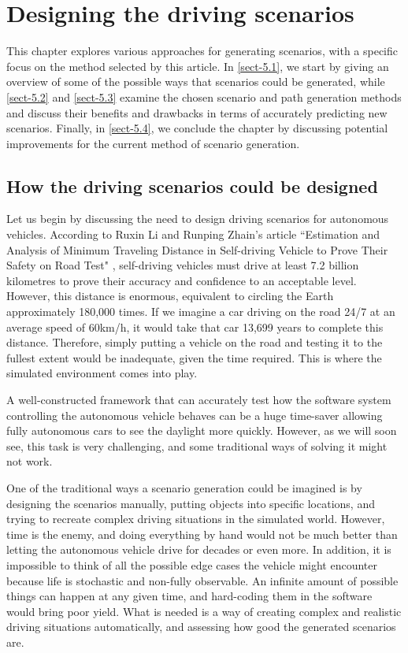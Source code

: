 \chapter{Designing the driving scenarios} \label{chap:five}
This chapter explores various approaches for generating scenarios, with a specific focus on the method selected by this article. In \autoref{sect-5.1}, we start by giving an overview of some of the possible ways that scenarios could be generated, while \autoref{sect-5.2} and \autoref{sect-5.3} examine the chosen scenario and path generation methods and discuss their benefits and drawbacks in terms of accurately predicting new scenarios. Finally, in \autoref{sect-5.4}, we conclude the chapter by discussing potential improvements for the current method of scenario generation.

\section{How the driving scenarios could be designed} \label{sect-5.1}
Let us begin by discussing the need to design driving scenarios for autonomous vehicles. According to Ruxin Li and Runping Zhain's article ``Estimation and Analysis of Minimum Traveling Distance in Self-driving Vehicle to Prove Their Safety on Road Test" \cite{li2019estimation}, self-driving vehicles must drive at least 7.2 billion kilometres to prove their accuracy and confidence to an acceptable level. However, this distance is enormous, equivalent to circling the Earth approximately 180,000 times. If we imagine a car driving on the road 24/7 at an average speed of 60km/h, it would take that car 13,699 years to complete this distance. Therefore, simply putting a vehicle on the road and testing it to the fullest extent would be inadequate, given the time required. This is where the simulated environment comes into play.

A well-constructed framework that can accurately test how the software system controlling the autonomous vehicle behaves can be a huge time-saver allowing fully autonomous cars to see the daylight more quickly. However, as we will soon see, this task is very challenging, and some traditional ways of solving it might not work.

One of the traditional ways a scenario generation could be imagined is by designing the scenarios manually, putting objects into specific locations, and trying to recreate complex driving situations in the simulated world. However, time is the enemy, and doing everything by hand would not be much better than letting the autonomous vehicle drive for decades or even more. In addition, it is impossible to think of all the possible edge cases the vehicle might encounter because life is stochastic and non-fully observable. An infinite amount of possible things can happen at any given time, and hard-coding them in the software would bring poor yield. What is needed is a way of creating complex and realistic driving situations automatically, and assessing how good the generated scenarios are.

